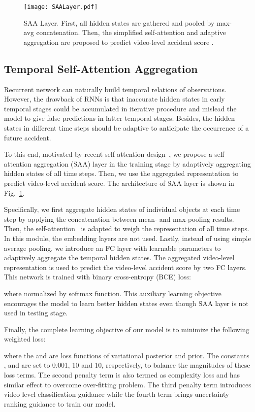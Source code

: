 \documentclass[sigconf]{acmart}
\begin{document}
\begin{figure}
    \centering
    \texttt{[image: SAALayer.pdf]}
    \caption{SAA Layer. First, all  hidden states are gathered and pooled by max-avg concatenation. Then, the simplified self-attention and adaptive aggregation are proposed to predict video-level accident score .}
    \label{fig:saa}
\end{figure}

\subsection{Temporal Self-Attention Aggregation}

Recurrent network can naturally build temporal relations of observations. However, the drawback of RNNs is that inaccurate hidden states in early temporal stages could be accumulated in iterative procedure and mislead the model to give false predictions in latter temporal stages. Besides, the hidden states in different time steps should be adaptive to anticipate the occurrence of a future accident.

To this end, motivated by recent self-attention design~\cite{VaswaniNIPS2017}, we propose a self-attention aggregation (SAA) layer in the training stage by adaptively aggregating hidden states of all time steps. Then, we use the aggregated representation to predict video-level accident score. The architecture of SAA layer is shown in Fig.~\ref{fig:saa}.

Specifically, we first aggregate hidden states of  individual objects at each time step by applying the concatenation between mean- and max-pooling results. Then, the self-attention~\cite{VaswaniNIPS2017} is adapted to weigh the representation of all  time steps. In this module, the embedding layers are not used. Lastly, instead of using simple average pooling, we introduce an FC layer with  learnable parameters to adaptively aggregate the  temporal hidden states. The aggregated video-level representation is used to predict the video-level accident score  by two FC layers. This network is trained with binary cross-entropy (BCE) loss:

where  normalized by softmax function. This auxiliary learning objective encourages the model to learn better hidden states even though SAA layer is not used in testing stage. 

Finally, the complete learning objective of our model is to minimize the following weighted loss:

where the  and  are loss functions of variational posterior and prior. The constants ,  and  are set to 0.001, 10 and 10, respectively, to balance the magnitudes of these loss terms.
The second penalty term  is also termed as complexity loss and has similar effect to overcome over-fitting problem. The third penalty term  introduces video-level classification guidance while the fourth term  brings uncertainty ranking guidance to train our model.
\end{document}
